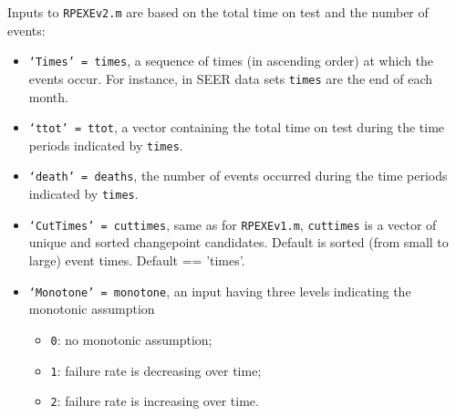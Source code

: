 \documentclass[12pt] {article}
\begin{document}
Inputs to {\tt RPEXEv2.m} are based on the total time on test and the
number of events:
\begin{itemize}
\item {\tt `Times' = times}, a sequence of times (in ascending order) at which the events occur. For instance, in SEER data sets {\tt times} are the end of each month.
\item {\tt `ttot' = ttot}, a vector containing the total time on test during the time periods indicated by {\tt times}.
\item {\tt `death' = deaths}, the number of events occurred during
    the time periods indicated by {\tt times}.
\item {\tt `CutTimes' = cuttimes}, same as for {\tt RPEXEv1.m},
    {\tt cuttimes} is a vector of unique and sorted changepoint candidates. Default is sorted (from small to large) event times. Default == 'times'.
\item {\tt `Monotone' = monotone}, an input having three levels indicating the monotonic assumption
    \begin{itemize}
        \item {\tt 0}: no monotonic assumption;
        \item {\tt 1}: failure rate is decreasing over time;
        \item {\tt 2}: failure rate is increasing over time.
    \end{itemize}
\end{itemize}
\end{document}
